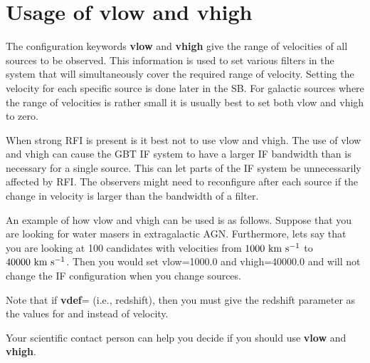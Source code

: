 \chapter{Usage of vlow and vhigh}\label{appendix:vlowhigh}

The configuration keywords {\bf vlow} and {\bf vhigh} give the range of
velocities of all sources to be observed. This information is used to set
various filters in the system that will simultaneously cover the required
range of velocity. Setting the velocity for each specific source is done
later in the \gls{SB}. For galactic sources where the range of velocities
is rather small it is usually best to set both vlow and vhigh to zero. 

When strong \gls{RFI} is present is it best not to use vlow and vhigh.  The use
of vlow and vhigh can cause the \gls{GBT} \gls{IF} system to have a larger
\gls{IF} bandwidth than is necessary for a single source.  This can let parts
of the \gls{IF} system be unnecessarily affected by \gls{RFI}. The observers
might need to reconfigure after each source if the change in velocity is larger
than the bandwidth of a filter.

An example of how vlow and vhigh can be used is as follows.  Suppose that
you are looking for water masers in extragalactic AGN.  Furthermore, lets
say that you are looking at 100 candidates with velocities from
$1000 ~{\rm km~s^{-1}}$ to $40000 ~{\rm km~s^{-1}}$.  Then you would
set vlow=1000.0 and vhigh=40000.0 and will not change the \gls{IF}
configuration when you change sources.
 
Note that if {\bf vdef}= (i.e., redshift), then you must give the redshift 
parameter  as the values for  and  instead of velocity. 

Your scientific contact person can help you decide if you should use
{\bf vlow} and {\bf vhigh}.

